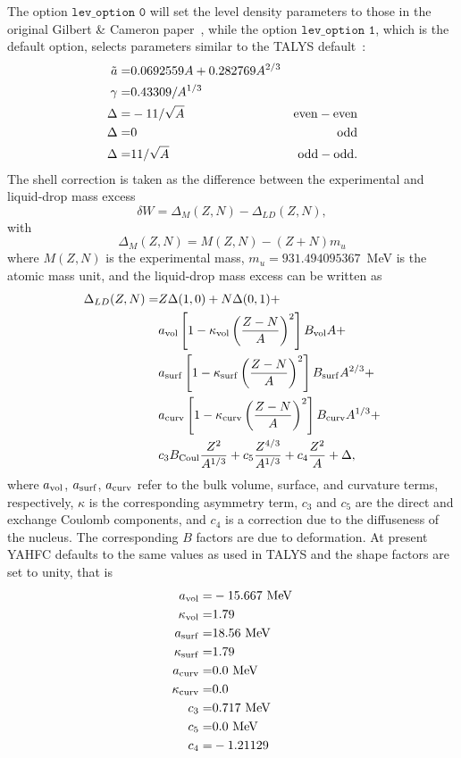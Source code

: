 \documentclass[
10pt,
showpacs,preprintnumbers,footinbib,
amsfonts,amsmath,amssymb,
aps,
prc,twocolumn,groupedaddress,superscriptaddress,
showkeys,
nofootinbib
]{revtex4-1}
\begin{document}
The option ${\texttt {lev\_option 0}}$ will set the level density parameters to those in the original Gilbert \& Cameron paper~\cite{Gilbert:1965}, while the option ${\texttt {lev\_option 1}}$, which is the default option, selects parameters similar to the TALYS default~\cite{TALYS}:
\begin{align}
\tilde a = & 0.0692559 A + 0.282769 A^{2/3} & \notag\\
\gamma = & 0.43309/A^{1/3} & \notag \\
\Delta =& -11/\sqrt{A} & {\rm {even-even}} \notag\\
\Delta =& 0 & {\rm {odd}}\notag\\
\Delta =& 11/\sqrt{A} & {\rm {odd-odd}}.
\end{align}
The shell correction is taken as the difference between the experimental and liquid-drop mass excess
\begin{equation}
\delta W = \Delta_M(Z,N) - \Delta_{LD}(Z,N),
\end{equation}
with
\begin{equation}
\Delta_M(Z,N) = M(Z,N) - (Z+N)m_u
\end{equation}
where $M(Z,N)$ is the experimental mass, $m_u = 931.494095367$~MeV is the atomic mass unit, and the liquid-drop mass excess can be written as~\cite{Myers:1966,Guet:1988,Moller:1988,Moller:1997}
\begin{align}
\Delta_{LD}(Z,N) = & Z \Delta(1,0) + N \Delta(0,1) + \notag \\
& a_{\rm vol} \left[1-\kappa_{\rm vol}\left( \frac{Z-N}{A}\right)^2\right ]B_{\rm vol}A + \notag \\
& a_{\rm surf} \left[1-\kappa_{\rm surf}\left( \frac{Z-N}{A}\right)^2\right ]B_{\rm surf}A^{2/3} + \notag \\
& a_{\rm curv} \left[1-\kappa_{\rm curv}\left( \frac{Z-N}{A}\right)^2\right ]B_{\rm curv}A^{1/3} + \notag \\
& c_3B_{\rm Coul}\frac{Z^2}{A^{1/3}} + c_5\frac{Z^{4/3}}{A^{1/3}} + c_4\frac{Z^2}{A} + \Delta,
\end{align}
where $a_{\rm vol}$, $a_{\rm surf}$, $a_{\rm curv}$ refer to the bulk volume, surface, and curvature terms, respectively, $\kappa$ is the corresponding asymmetry term, $c_3$ and $c_5$ are the direct and exchange Coulomb components, and $c_4$ is a correction due to the diffuseness of the nucleus. The corresponding $B$ factors are due to deformation. At present YAHFC defaults to the same values as used in TALYS and the shape factors are set to unity, that is
\begin{align}
a_{\rm vol} =& -15.667~{\rm MeV} \notag\\
\kappa_{\rm vol} = & 1.79 \notag\\
a_{\rm surf} =& 18.56~{\rm MeV} \notag\\
\kappa_{\rm surf} = & 1.79 \notag\\
a_{\rm curv} =& 0.0~{\rm MeV} \notag\\
\kappa_{\rm curv} = & 0.0 \notag\\
c_3 =& 0.717~{\rm MeV}\notag\\
c_5 =& 0.0~{\rm MeV}\notag\\
c_4 =& -1.21129
\end{align}
\end{document}
